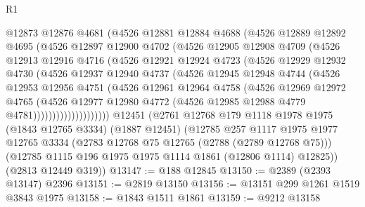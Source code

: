 \begin{lexlean}{R1}
\begin{coremodule}
                @12873
                @12876
                @4681
                (@4526
                  @12881
                  @12884
                  @4688
                  (@4526
                    @12889
                    @12892
                    @4695
                    (@4526
                      @12897
                      @12900
                      @4702
                      (@4526
                        @12905
                        @12908
                        @4709
                        (@4526
                          @12913
                          @12916
                          @4716
                          (@4526
                            @12921
                            @12924
                            @4723
                            (@4526
                              @12929
                              @12932
                              @4730
                              (@4526
                                @12937
                                @12940
                                @4737
                                (@4526
                                  @12945
                                  @12948
                                  @4744
                                  (@4526
                                    @12953
                                    @12956
                                    @4751
                                    (@4526
                                      @12961
                                      @12964
                                      @4758
                                      (@4526
                                        @12969
                                        @12972
                                        @4765
                                        (@4526
                                          @12977
                                          @12980
                                          @4772
                                          (@4526 @12985 @12988 @4779 @4781))))))))))))))))))))
    @12451
    (@2761
      @12768
      @179
      @1118
      @1978
      @1975
      (@1843 @12765 @3334)
      (@1887 @12451)
      (@12785
        @257
        @1117
        @1975
        @1977
        @12765
        @3334
        (@2783 @12768 @75 @12765 (@2788 (@2789 @12768 @75)))
        (@12785 @1115 @196 @1975 @1975 @1114 @1861 (@12806 @1114) @12825))
      (@2813 @12449 @319))
@13147 := @188 @12845
@13150 := @2389 (@2393 @13147) @2396
@13151 := @2819 @13150
@13156 := @13151 @299 @1261 @1519 @3843 @1975
@13158 := @1843 @1511 @1861
@13159 := @9212 @13158

\end{coremodule}
\end{lexlean}
